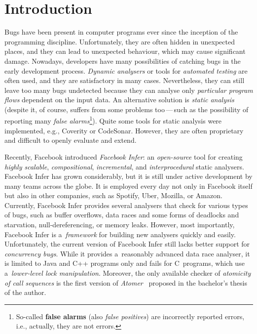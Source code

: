\documentclass{ExcelAtFIT}
\affiliation{%
    *\href{mailto:xharmi00@stud.fit.vutbr.cz}{xharmi00@stud.fit.vutbr.cz},
    \textit{Faculty of Information Technology, Brno University of Technology}%
}
\theoremstyle{definition}
\begin{document}
\setlength{\abovedisplayskip}{.3em}
\setlength{\belowdisplayskip}{.3em}

\addtolength{\skip\footins}{-.3em}


\startdocument




\section{Introduction}

Bugs have been present in computer programs ever since the inception of the programming discipline. Unfortunately, they are often hidden in unexpected places, and they can lead to unexpected behaviour, which may cause significant damage. Nowadays, developers have many possibilities of catching bugs in the early development process. \emph{Dynamic analysers} or tools for \emph{automated testing} are often used, and they are satisfactory in many cases. Nevertheless, they can still leave too many bugs undetected because they can analyse only \emph{particular program flows} dependent on the input data. An alternative solution is \emph{static analysis} (despite it, of course, suffers from some problems too\,---\,such as the possibility of reporting many \emph{false alarms}\footnote{So-called \textbf{false alarms} (also \emph{false positives}) are incorrectly reported errors, i.e., actually, they are not errors.}). Quite some tools for static analysis were implemented, e.g., Coverity or CodeSonar. However, they are often proprietary and difficult to openly evaluate and extend.

Recently, Facebook introduced \emph{Facebook Infer}: an \emph{open-source} tool for creating \emph{highly scalable}, \emph{compositional}, \emph{incremental}, and \emph{interprocedural} static analysers. Facebook Infer has grown considerably, but it is still under active development by many teams across the globe. It is employed every day not only in Facebook itself but also in other companies, such as Spotify, Uber, Mozilla, or Amazon. Currently, Facebook Infer provides several analysers that check for various types of bugs, such as buffer overflows, data races and some forms of deadlocks and starvation, null-dereferencing, or memory leaks. However, most importantly, Facebook Infer is a~\emph{framework} for building new analysers quickly and easily. Unfortunately, the current version of Facebook Infer still lacks better support for \emph{concurrency bugs}. While it provides a~reasonably advanced data race analyser, it is limited to Java and C++ programs only and fails for C~programs, which use a~\emph{lower-level lock manipulation}. Moreover, the only available checker of \emph{atomicity of call sequences} is the first version of \emph{Atomer}~\cite{harmimBP} proposed in the bachelor's thesis of the author.
\end{document}
